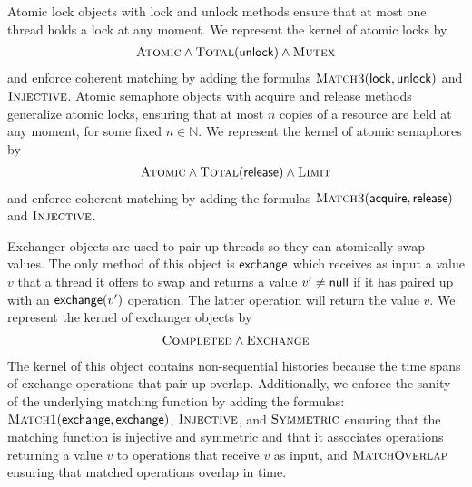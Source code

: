 \begin{example}

  Atomic lock objects with {\sf lock} and {\sf unlock} methods ensure that at
  most one thread holds a lock at any moment. We represent the kernel of atomic
  locks by
  \begin{align*}
    \textsc{Atomic} \land \textsc{Total}({\sf unlock}) \land \textsc{Mutex}
  \end{align*}
  and enforce coherent matching by adding the formulas $\textsc{Match3}({\sf
  lock},{\sf unlock})$ and $\textsc{Injective}$.
  Atomic semaphore objects with {\sf acquire} and {\sf release} methods generalize
  atomic locks, ensuring that at most $n$ copies of a resource are held at any
  moment, for some fixed $n \in \mathbb{N}$. We represent the kernel of atomic
  semaphores by
  \begin{align*}
    \textsc{Atomic} \land \textsc{Total}({\sf release}) \land \textsc{Limit}
  \end{align*}
  and enforce coherent matching by adding the formulas 
  $\textsc{Match3}({\sf acquire},{\sf release})$ and $\textsc{Injective}$.
  
  Exchanger objects are used to pair up threads so they can atomically swap
  values. The only method of this object is ${\sf exchange}$ which receives as
  input a value $v$ that a thread it offers to swap and returns a value $v'\neq
  {\sf null}$ if it has paired up with an ${\sf exchange}(v')$ operation. The latter
  operation will return the value $v$. We represent the kernel of exchanger
  objects by
  \begin{align*}
     \textsc{Completed} \land \textsc{Exchange}
  \end{align*}
  The kernel of this object contains non-sequential histories
  because the time spans of exchange
  operations that pair up overlap.
  Additionally, we enforce the sanity of the underlying matching function by
  adding the formulas: $\textsc{Match1}({\sf exchange},{\sf
  exchange})$, $\textsc{Injective}$, and $\textsc{Symmetric}$
  ensuring that the matching function is injective and symmetric and that it
  associates operations returning a value $v$ to operations that receive $v$
  as input, and $\textsc{MatchOverlap}$ ensuring that matched operations
  overlap in time.
  
\end{example}

